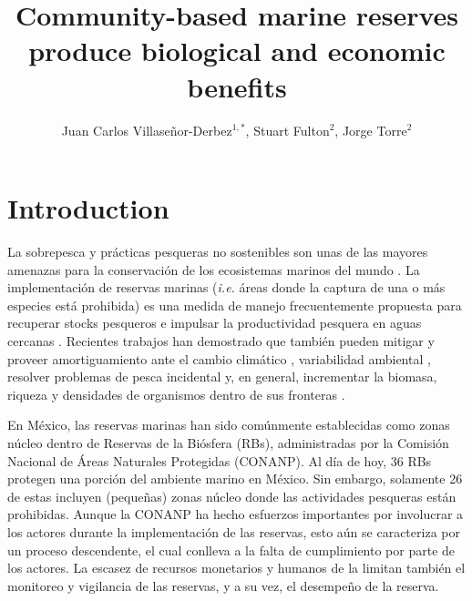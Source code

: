 \documentclass{frontiersSCNS}
\def\firstAuthorLast{Villaseñor-Derbez {et~al.}}
\def\Authors{Juan Carlos Villaseñor-Derbez\(^{1,*}\), Stuart Fulton\(^{2}\), Jorge
Torre\(^{2}\)}
\begin{document}
\onecolumn
{}

\title[Mexican marine reserves]{Community-based marine reserves produce biological and economic benefits} 

\author[\firstAuthorLast ]{\Authors} %
\address{} %
\correspondance{} %

\extraAuth{}

\maketitle



\section{Introduction}\label{introduction}

La sobrepesca y prácticas pesqueras no sostenibles son unas de las
mayores amenazas para la conservación de los ecosistemas marinos del
mundo \citep{halpern_2008-dK,halpern_2017-Zi}. La implementación de
reservas marinas (\emph{i.e.} áreas donde la captura de una o más
especies está prohibida) es una medida de manejo frecuentemente
propuesta para recuperar stocks pesqueros e impulsar la productividad
pesquera en aguas cercanas
\citep{afflerbach_2014-HP,krueck_2017-J1,sala_2017-69}. Recientes
trabajos han demostrado que también pueden mitigar y proveer
amortiguamiento ante el cambio climático \citep{roberts_2017-J9},
variabilidad ambiental \citep{micheli_2012-EU}, resolver problemas de
pesca incidental \citep{hastings_2017-sm} y, en general, incrementar la
biomasa, riqueza y densidades de organismos dentro de sus fronteras
\citep{lester_2009-Ks,giakoumi_2017-V2,sala_2017-69}.

En México, las reservas marinas han sido comúnmente establecidas como
zonas núcleo dentro de Reservas de la Biósfera (RBs), administradas por
la Comisión Nacional de Áreas Naturales Protegidas (CONANP). Al día de
hoy, 36 RBs protegen una porción del ambiente marino en México. Sin
embargo, solamente 26 de estas incluyen (pequeñas) zonas núcleo donde
las actividades pesqueras están prohibidas. Aunque la CONANP ha hecho
esfuerzos importantes por involucrar a los actores durante la
implementación de las reservas, esto aún se caracteriza por un proceso
descendente, el cual conlleva a la falta de cumplimiento por parte de
los actores. La escasez de recursos monetarios y humanos de la limitan
también el monitoreo y vigilancia de las reservas, y a su vez, el
desempeño de la reserva.
\end{document}

